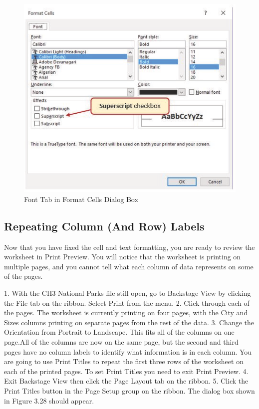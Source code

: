 \begin{figure}[H]
	\centering
	\includegraphics[width=\maxwidth{.95\linewidth}]{gfx/ch03_fig28}
	\caption{Font Tab in Format Cells Dialog Box}
	\label{03:fig28}
\end{figure}


\subsection{Repeating Column (And Row) Labels}

Now that you have fixed the cell and text formatting, you are ready to review the worksheet in Print
Preview. You will notice that the worksheet is printing on multiple pages, and you cannot tell what
each column of data represents on some of the pages.

1. With the CH3 National Parks file still open, go to Backstage View by clicking the File tab on the
ribbon. Select Print from the menu.
2. Click through each of the pages. The worksheet is currently printing on four pages, with the
City and Sizes columns printing on separate pages from the rest of the data.
3. Change the Orientation from Portrait to Landscape. This fits all of the columns on one page.All
of the columns are now on the same page, but the second and third pages have no column labels
to identify what information is in each column. You are going to use Print Titles to repeat the
first three rows of the worksheet on each of the printed pages. To set Print Titles you need to
exit Print Preview.
4. Exit Backstage View then click the Page Layout tab on the ribbon.
5. Click the Print Titles button in the Page Setup group on the ribbon. The dialog box shown
in Figure 3.28 should appear.



